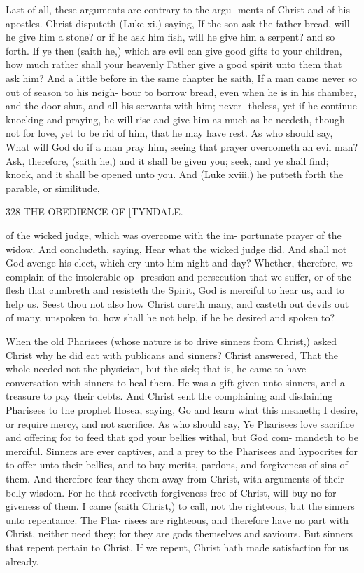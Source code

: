 \documentclass{custom}
\begin{document}
{Last of all, these arguments are contrary to the argu- 
ments of Christ and of his apostles. Christ disputeth 
(Luke xi.) saying, If the son ask the father bread, will he 
give him a stone? or if he ask him fish, will he give him a 
serpent? and so forth. If ye then (saith he,) which are 
evil can give good gifts to your children, how much rather 
shall your heavenly Father give a good spirit unto them 
that ask him? And a little before in the same chapter he 
saith, If a man came never so out of season to his neigh- 
bour to borrow bread, even when he is in his chamber, 
and the door shut, and all his servants with him; never- 
theless, yet if he continue knocking and praying, he will 
rise and give him as much as he needeth, though not for 
love, yet to be rid of him, that he may have rest. As who 
should say, What will God do if a man pray him, seeing 
that prayer overcometh an evil man? Ask, therefore, 
(saith he,) and it shall be given you; seek, and ye shall 
find; knock, and it shall be opened unto you. And 
(Luke xviii.) he putteth forth the parable, or similitude, 


328
THE OBEDIENCE OF
[TYNDALE.

of the wicked judge, which was overcome with the im- 
portunate prayer of the widow. And concludeth, saying, 
Hear what the wicked judge did. And shall not God 
avenge his elect, which cry unto him night and day? 
Whether, therefore, we complain of the intolerable op- 
pression and persecution that we suffer, or of the flesh that 
cumbreth and resisteth the Spirit, God is merciful to hear 
us, and to help us. Seest thou not also how Christ cureth 
many, and casteth out devils out of many, unspoken to, 
how shall he not help, if he be desired and spoken to? 

When the old Pharisees (whose nature is to drive 
sinners from Christ,) asked Christ why he did eat with 
publicans and sinners? Christ answered, That the whole 
needed not the physician, but the sick; that is, he came to 
have conversation with sinners to heal them. He was a 
gift given unto sinners, and a treasure to pay their debts. 
And Christ sent the complaining and disdaining Pharisees 
to the prophet Hosea, saying, Go and learn what this 
meaneth; I desire, or require mercy, and not sacrifice. As 
who should say, Ye Pharisees love sacrifice and offering 
for to feed that god your bellies withal, but God com- 
mandeth to be merciful. Sinners are ever captives, and 
a prey to the Pharisees and hypocrites for to offer unto 
their bellies, and to buy merits, pardons, and forgiveness 
of sins of them. And therefore fear they them away from 
Christ, with arguments of their belly-wisdom. For he 
that receiveth forgiveness free of Christ, will buy no for- 
giveness of them. I came (saith Christ,) to call, not the 
righteous, but the sinners unto repentance. The Pha- 
risees are righteous, and therefore have no part with Christ, 
neither need they; for they are gods themselves and 
saviours. But sinners that repent pertain to Christ. 
If we repent, Christ hath made satisfaction for us 
already. 

}
\end{document}
